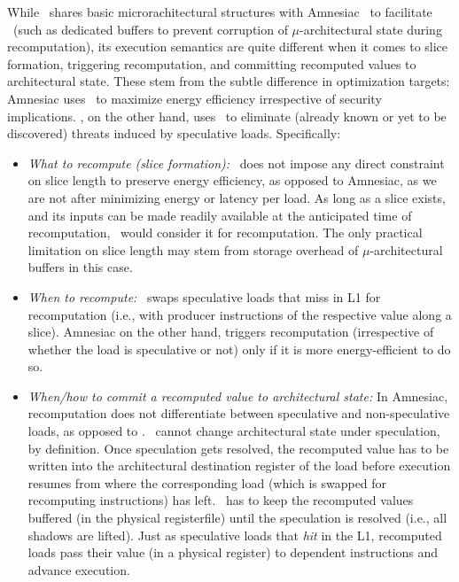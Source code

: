 While \arch\ shares basic microrachitectural structures with Amnesiac~\cite{amnesiac17} to facilitate \recomp\ (such as dedicated buffers to prevent corruption of $\mu$-architectural state during recomputation), its
execution semantics are quite different when it comes to slice formation, triggering recomputation, and committing recomputed values to architectural state. These stem from the subtle difference in optimization targets: Amnesiac uses \recomp\ to maximize energy efficiency irrespective of security implications. \arch, on the other hand, uses \recomp\ to eliminate (already known or yet to be discovered) threats induced by speculative loads. Specifically: 
 \begin{itemize}
     \item{\em What to recompute (slice formation):} \arch\ does not impose any direct constraint on slice length to preserve energy efficiency, as opposed to Amnesiac, as we are not after minimizing energy or latency per load. As long as a slice exists, and its inputs can be made readily available at the anticipated time of recomputation, \arch\ would consider it for recomputation. The only practical limitation on slice length may stem from storage overhead of $\mu$-architectural buffers in this case. 
     \item {\em When to recompute:} \arch\ swaps speculative loads that miss in L1 for recomputation (i.e., with producer instructions of the respective value along a slice). Amnesiac on the other hand, triggers recomputation (irrespective of whether the load is speculative or not) only if it is more energy-efficient to do so. 
     \item{\em When/how to commit a recomputed value to architectural state:} In Amnesiac, recomputation does not differentiate between speculative and non-speculative loads, as opposed to \arch. \recomp\ cannot change architectural state under speculation, by definition. Once speculation gets resolved, the recomputed value has to be  written into the architectural destination register of the load before execution resumes from where the corresponding load (which is swapped for recomputing instructions) has left. \arch\ has to keep the recomputed values buffered (in the physical registerfile) until the speculation is resolved (i.e., all shadows are lifted). {Just as speculative loads that \emph{hit} in the L1, recomputed loads pass their value (in a physical register) to dependent instructions and advance execution.}  
 \end{itemize}
 
